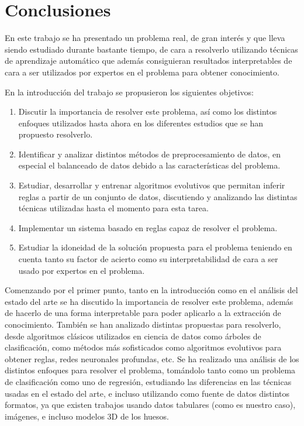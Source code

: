 \section{Conclusiones}

En este trabajo se ha presentado un problema real, de gran interés y que lleva siendo estudiado durante bastante tiempo, de cara a resolverlo utilizando técnicas de aprendizaje automático que además consiguieran resultados interpretables de cara a ser utilizados por expertos en el problema para obtener conocimiento.

En la introducción del trabajo se propusieron los siguientes objetivos:

\begin{enumerate}
	\item Discutir la importancia de resolver este problema, así como los distintos enfoques utilizados hasta ahora en los diferentes estudios que se han propuesto resolverlo.
	\item Identificar y analizar distintos métodos de preprocesamiento de datos, en especial el balanceado de datos debido a las características del problema.
	\item Estudiar, desarrollar y entrenar algoritmos evolutivos que permitan inferir reglas a partir de un conjunto de datos, discutiendo y analizando las distintas técnicas utilizadas hasta el momento para esta tarea.
	\item Implementar un sistema basado en reglas capaz de resolver el problema.
	\item Estudiar la idoneidad de la solución propuesta para el problema teniendo en cuenta tanto su factor de acierto como su interpretabilidad de cara a ser usado por expertos en el problema.
\end{enumerate}

Comenzando por el primer punto, tanto en la introducción como en el análisis del estado del arte se ha discutido la importancia de resolver este problema, además de hacerlo de una forma interpretable para poder aplicarlo a la extracción de conocimiento. También se han analizado distintas propuestas para resolverlo, desde algoritmos clásicos utilizados en ciencia de datos como árboles de clasificación, como métodos más sofisticados como algoritmos evolutivos para obtener reglas, redes neuronales profundas, etc. Se ha realizado una análisis de los distintos enfoques para resolver el problema, tomándolo tanto como un problema de clasificación como uno de regresión, estudiando las diferencias en las técnicas usadas en el estado del arte, e incluso utilizando como fuente de datos distintos formatos, ya que existen trabajos usando datos tabulares (como es nuestro caso), imágenes, e incluso modelos 3D de los huesos.


